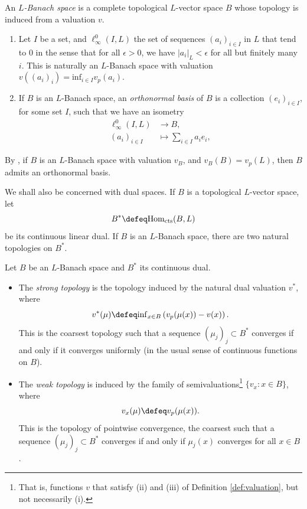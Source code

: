 \documentclass[a4paper,10pt, english, reqno]{smfart}
\numberwithin{equation}{section}
\begin{document}
\begin{definition}\label{def:Banach}
An \emph{$L$-Banach space} is a complete topological $L$-vector space $B$ whose topology is induced from a valuation $v$.
\end{definition}

	
\begin{definition}\label{def:orthonormal}
\begin{enumerate}
\item	Let $I$ be a set, and $\ell^0_\infty(I,L)$ the set of sequences $(a_i)_{i\in I}$ in $L$ that tend to 0 in the sense that for all $\epsilon > 0$, we have $|a_i|_L < \epsilon$ for all but finitely many $i$. This is naturally an $L$-Banach space with valuation $v((a_i)_{i}) = \mathrm{inf}_{i \in I} v_p(a_i).$
			
\item If $B$ is an $L$-Banach space, an \emph{orthonormal basis} of $B$ is a collection $(e_i)_{i \in I}$, for some set $I$, such that we have an isometry
\begin{align*}
\ell^0_\infty(I, L) &\longrightarrow B,\\
(a_i)_{i \in I} &\longmapsto \sum_{i \in I} a_i e_i,
\end{align*}
 \end{enumerate}
 \end{definition}

\begin{remark}
By \cite[Prop.\ I.1.5]{Colm10}, if $B$ is an $L$-Banach space with valuation $v_B$, and $v_B(B) = v_p(L)$, then $B$ admits an orthonormal basis.
\end{remark}



We shall also be concerned with dual spaces. If $B$ is a topological $L$-vector space, let
\[
B^* \defeq \mathrm{Hom}_{\mathrm{cts}}(B, L)
\]
be its continuous linear dual. If $B$ is an $L$-Banach space, there are two natural topologies on $B^*$.

\begin{definition}\label{def:strong topology} Let $B$ be an $L$-Banach space and $B^*$ its continuous dual.
\begin{itemize}
\item The \emph{strong topology} is the topology induced by the natural dual valuation $v^*$, where
\[
v^*(\mu) \defeq \mathrm{inf}_{x \in B} \left(v_p(\mu(x)) - v(x)\right).
\]   
This is the coarsest topology such that a sequence $(\mu_j)_j \subset B^*$ converges if and only if it converges uniformly (in the usual sense of continuous functions on $B$).

\item The \emph{weak topology} is induced by the family of semivaluations\footnote{That is, functions $v$ that satisfy (ii) and (iii) of Definition \ref{def:valuation}, but not necessarily (i).} $\{v_x: x \in B\}$, where
\[
v_x(\mu) \defeq v_p(\mu(x)).
\]
This is the topology of pointwise convergence, the coarsest such that a sequence $(\mu_j)_j \subset B^*$ converges if and only if $\mu_j(x)$ converges for all $x \in B$.
\end{itemize}
\end{definition}
\end{document}
